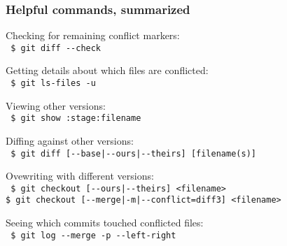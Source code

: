 \documentclass[t]{beamer}
\begin{document}

\begin{frame}
  \frametitle{Helpful commands, summarized}

  Checking for remaining conflict markers:\\
    {\scriptsize\texttt{%
    \$ git diff -{}-check\\[\baselineskip]
    }}

  Getting details about which files are conflicted:\\
    {\footnotesize\texttt{%
    \$ git ls-files -u \\[\baselineskip]
    }}

  Viewing other versions:\\
    {\footnotesize\texttt{%
    \$ git show :stage:filename \\[\baselineskip]
    }}

  Diffing against other versions:\\
    {\footnotesize\texttt{%
    \$ git diff [-{}-base|-{}-ours|-{}-theirs] [filename(s)] \\[\baselineskip]
    }}

  Ovewriting with different versions:\\
    {\footnotesize\texttt{%
    \$ git checkout [-{}-ours|-{}-theirs] <filename> \\
    \$ git checkout [-{}-merge|-m|-{}-conflict=diff3] <filename>
          \\[\baselineskip]
    }}

  Seeing which commits touched conflicted files:\\
    {\scriptsize\texttt{%
    \$ git log -{}-merge -p -{}-left-right\\[\baselineskip]
    }}

\end{frame}

\end{document}
